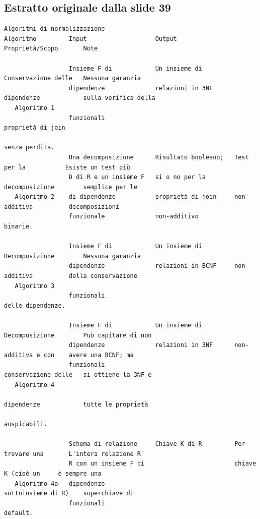 \documentclass[11pt]{article}
\begin{document}
\subsection*{Estratto originale dalla slide 39}
\begin{lstlisting}
Algoritmi di normalizzazione
Algoritmo         Input                   Output                Proprietà/Scopo       Note

                  Insieme F di            Un insieme di         Conservazione delle   Nessuna garanzia
                  dipendenze              relazioni in 3NF      dipendenze            sulla verifica della
   Algoritmo 1
                  funzionali                                                          proprietà di join
                                                                                      senza perdita.
                  Una decomposizione      Risultato booleano;   Test per la           Esiste un test più
                  D di R e un insieme F   si o no per la        decomposizione        semplice per le
   Algoritmo 2    di dipendenze           proprietà di join     non-additiva          decomposizioni
                  funzionale              non-additivo                                binarie.

                  Insieme F di            Un insieme di         Decomposizione        Nessuna garanzia
                  dipendenze              relazioni in BCNF     non-additiva          della conservazione
   Algoritmo 3
                  funzionali                                                          delle dipendenze.

                  Insieme F di            Un insieme di         Decomposizione        Può capitare di non
                  dipendenze              relazioni in 3NF      non-additiva e con    avere una BCNF; ma
                  funzionali                                    conservazione delle   si ottiene la 3NF e
   Algoritmo 4
                                                                dipendenze            tutte le proprietà
                                                                                      auspicabili.

                  Schema di relazione     Chiave K di R         Per trovare una       L'intera relazione R
                  R con un insieme F di                         chiave K (cioè un     è sempre una
   Algoritmo 4a   dipendenze                                    sottoinsieme di R)    superchiave di
                  funzionali                                                          default.
\end{lstlisting}
\end{document}
